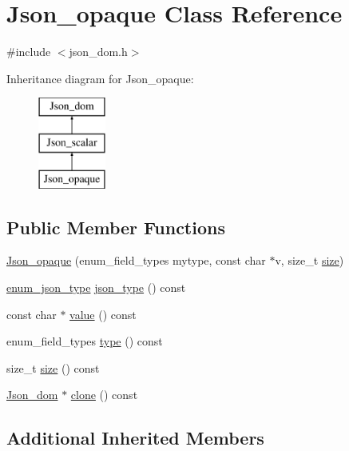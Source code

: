 \hypertarget{classJson__opaque}{}\section{Json\+\_\+opaque Class Reference}
\label{classJson__opaque}


{\ttfamily \#include $<$json\+\_\+dom.\+h$>$}

Inheritance diagram for Json\+\_\+opaque\+:\begin{figure}[H]
\begin{center}
\leavevmode
\includegraphics[height=3.000000cm]{classJson__opaque}
\end{center}
\end{figure}
\subsection*{Public Member Functions}
\begin{DoxyCompactItemize}
\item 
\mbox{\hyperlink{classJson__opaque_ad4165bb22dbe8d6a07a70e4739ab0206}{Json\+\_\+opaque}} (enum\+\_\+field\+\_\+types mytype, const char $\ast$v, size\+\_\+t \mbox{\hyperlink{classJson__opaque_a2fbbcd3d9081289cc0c591630e219ae1}{size}})
\item 
\mbox{\hyperlink{classJson__dom_af37eed7dfe1da1d6507d3ab85320eb03}{enum\+\_\+json\+\_\+type}} \mbox{\hyperlink{classJson__opaque_a28fc1b6c4e0feab7897bf6bb810f7919}{json\+\_\+type}} () const
\item 
const char $\ast$ \mbox{\hyperlink{classJson__opaque_a88b1367f0b9ae23450f478c08dd2bc36}{value}} () const
\item 
enum\+\_\+field\+\_\+types \mbox{\hyperlink{classJson__opaque_a26750dc18ad9eb5333e82a0b25815f29}{type}} () const
\item 
size\+\_\+t \mbox{\hyperlink{classJson__opaque_a2fbbcd3d9081289cc0c591630e219ae1}{size}} () const
\item 
\mbox{\hyperlink{classJson__dom}{Json\+\_\+dom}} $\ast$ \mbox{\hyperlink{classJson__opaque_ab40f723d80c2cfcaa4077fb4187c0fc8}{clone}} () const
\end{DoxyCompactItemize}
\subsection*{Additional Inherited Members}


